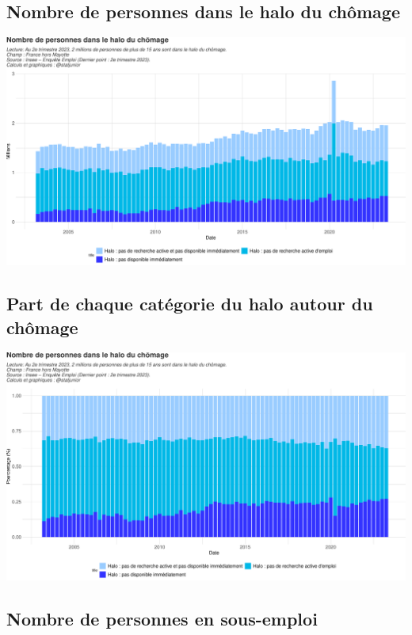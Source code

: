 \documentclass[
  paper=a4,
  ,captions=tableheading
]{scrartcl}
\begin{document}
\hypertarget{nombre-de-personnes-dans-le-halo-du-chuxf4mage}{%
\subsection{Nombre de personnes dans le halo du
chômage}\label{nombre-de-personnes-dans-le-halo-du-chuxf4mage}}

\includegraphics{rapport_activite_emploi_chomage_insee_files/figure-latex/unnamed-chunk-25-1.pdf}

\hypertarget{part-de-chaque-catuxe9gorie-du-halo-autour-du-chuxf4mage}{%
\subsection{Part de chaque catégorie du halo autour du
chômage}\label{part-de-chaque-catuxe9gorie-du-halo-autour-du-chuxf4mage}}

\includegraphics{rapport_activite_emploi_chomage_insee_files/figure-latex/unnamed-chunk-26-1.pdf}

\hypertarget{nombre-de-personnes-en-sous-emploi}{%
\subsection{Nombre de personnes en
sous-emploi}\label{nombre-de-personnes-en-sous-emploi}}
\end{document}
